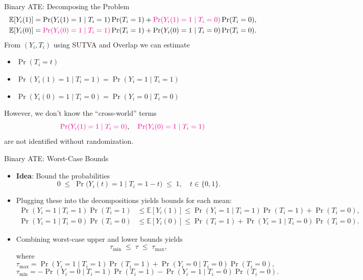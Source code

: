 \documentclass[10pt]{beamer}
\theoremstyle{plain}
\begin{document}
\begin{frame}{Binary ATE: Decomposing the Problem}
  \small
  \begin{align*}
    \mathbb{E}[Y_i(1)]
    &= \Pr( Y_i(1) = 1 \mid T_i = 1 )\Pr(T_i = 1)
       + \textcolor{magenta}{\Pr(Y_i(1) = 1 \mid T_i = 0)} \Pr(T_i = 0), \\
    \mathbb{E}[Y_i(0)]
    &= \textcolor{magenta}{\Pr(Y_i(0) = 1 \mid T_i = 1)}\Pr(T_i = 1)
       + \Pr( Y_i(0) = 1 \mid T_i = 0 )\Pr(T_i = 0).
  \end{align*}
  \pause
  From $(Y_i, T_i)$ using SUTVA and Overlap we can estimate
  \begin{itemize}
  \item $\Pr(T_i = t)$
  \item $ \Pr(Y_i(1) = 1 \mid T_i = 1) = \Pr(Y_i = 1 \mid T_i = 1)$
  \item $ \Pr(Y_i(0) = 1 \mid T_i = 0) = \Pr(Y_i = 0 \mid T_i = 0)$
  \end{itemize}
  \pause
   However, we don't know the “cross-world” terms
    \[
      \textcolor{magenta}{\Pr(Y_i(1) = 1 \mid T_i = 0)}, \quad
      \textcolor{magenta}{\Pr(Y_i(0) = 1 \mid T_i = 1)}
    \]
    are not identified without randomization.
\end{frame}

\begin{frame}{Binary ATE: Worst-Case Bounds}
  \footnotesize
  \begin{itemize}
     \item \textbf{Idea}: Bound the probabilities
        \[
            0 \;\le\; \Pr\bigl(Y_i(t) = 1 \mid T_i = 1-t\bigr) \;\le\; 1,
      \quad t \in \{0,1\}.
        \]
    \pause
    \item Plugging these into the decompositions yields bounds for each mean:
    \begin{align*}
      \Pr(Y_i = 1 \mid T_i = 1)\Pr(T_i = 1)
      &\le \mathbb{E}[Y_i(1)]
      \le \Pr(Y_i = 1 \mid T_i = 1)\Pr(T_i = 1) + \Pr(T_i = 0), \\
      \Pr(Y_i = 1 \mid T_i = 0)\Pr(T_i = 0)
      &\le \mathbb{E}[Y_i(0)]
      \le \Pr(T_i = 1) + \Pr(Y_i = 1 \mid T_i = 0)\Pr(T_i = 0).
    \end{align*}
    \pause
    \item Combining worst-case upper and lower bounds yields
    \[
      \tau_{\min} \;\le\; \tau \;\le\; \tau_{\max},
    \]
    where
    \[
      \tau_{\max} =
      \Pr(Y_i = 1 \mid T_i = 1)\Pr(T_i = 1)
      + \Pr(Y_i = 0 \mid T_i = 0)\Pr(T_i = 0),
    \]
    \[
      \tau_{\min} =
      - \Pr(Y_i = 0 \mid T_i = 1)\Pr(T_i = 1)
      - \Pr(Y_i = 1 \mid T_i = 0)\Pr(T_i = 0).
    \]
  \end{itemize}
\end{frame}
\end{document}
